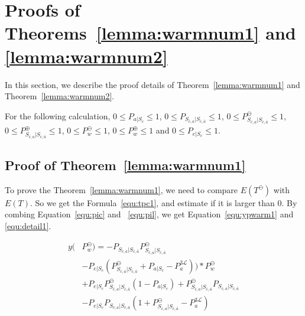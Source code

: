 \newpage
\section{Proofs of Theorems~\ref{lemma:warmnum1} and \ref{lemma:warmnum2}}
\label{appendixa}
In this section, we describe the proof details of Theorem~\ref{lemma:warmnum1} and Theorem~\ref{lemma:warmnum2}.

For the following calculation, $0 \leq P_{a|S_{c}} \leq 1$, $0 \leq P_{S_{\bar{c}, a}|S_{\bar{c},\bar{a}}} \leq 1$, $0 \leq P_{S_{\bar{c}, a}|S_{\bar{c},\bar{a}}}^{\ominus} \leq 1$, $0 \leq P_{S_{\bar{c}, a}|S_{\bar{c},\bar{a}}}^{\oplus} \leq 1$, $0 \leq P_{w}^{\ominus} \leq 1$, $0 \leq P_{w}^{\oplus} \leq 1$
 and $0 \leq P_{e|S_{c}} \leq 1$.

\subsection{Proof of Theorem~\ref{lemma:warmnum1}}
\label{appendixa1}
To prove the Theorem~\ref{lemma:warmnum1}, we need to compare $E(T^{\ominus})$ with $E(T)$.
So we get the Formula~\ref{equ:tpc1}, and estimate if it is larger than $0$.
By combing Equation~\ref{equ:pic} and ~\ref{equ:pil}, we get Equation~\ref{equ:ypwarm1} and \ref{equ:detail1}.

\begin{equation}
\label{equ:ypwarm1}
\begin{split}
y(&P_{w}^{\ominus}) = -P_{S_{\bar{c}, a}|S_{\bar{c},\bar{a}}}P_{S_{\bar{c}, a}|S_{\bar{c},\bar{a}}}^{\ominus} \\
&-P_{e|S_{c}}(P_{S_{\bar{c}, a}|S_{\bar{c},\bar{a}}}^{\ominus}+P_{a|S_{c}}-P_{a}^{\mathfrak{3}\mathcal{L}}))*P_{w}^{\ominus} \\
& +  P_{e|S_{c}}P_{S_{\bar{c}, a}|S_{\bar{c},\bar{a}}}^{\ominus}(1-P_{a|S_{c}})+P_{S_{\bar{c}, a}|S_{\bar{c},\bar{a}}}^{\ominus}P_{S_{\bar{c}, a}|S_{\bar{c},\bar{a}}}\\
& - P_{e|S_{c}}P_{S_{\bar{c}, a}|S_{\bar{c},\bar{a}}}(1+P_{S_{\bar{c}, a}|S_{\bar{c},\bar{a}}}^{\ominus}-P_{a}^{\mathfrak{3}\mathcal{L}}) \,
\end{split}\end{equation}

